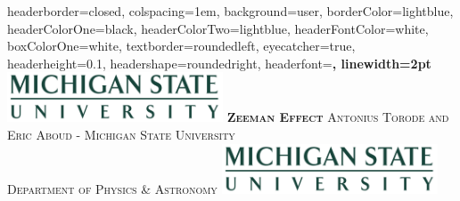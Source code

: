 \documentclass[landscape,a0paper,fontscale=0.285]{baposter} %
\begin{document}
\begin{poster}
{
headerborder=closed, %
colspacing=1em, %
background=user,
borderColor=lightblue, %
headerColorOne=black, %
headerColorTwo=lightblue, %
headerFontColor=white, %
boxColorOne=white, %
textborder=roundedleft, %
eyecatcher=true, %
headerheight=0.1\textheight, %
headershape=roundedright, %
headerfont=\Large\bf\textsc, %
linewidth=2pt %
}
%
{\includegraphics[height=4em]{MSU.jpg}} %
{\bf\textsc{Zeeman Effect}\vspace{0.5em}} %
{\textsc{Antonius Torode and Eric Aboud -  \hspace{12pt} Michigan State University \\ Department of Physics \& Astronomy}} %
{\includegraphics[height=4em]{MSU.jpg}} %



\end{poster}
\end{document}
